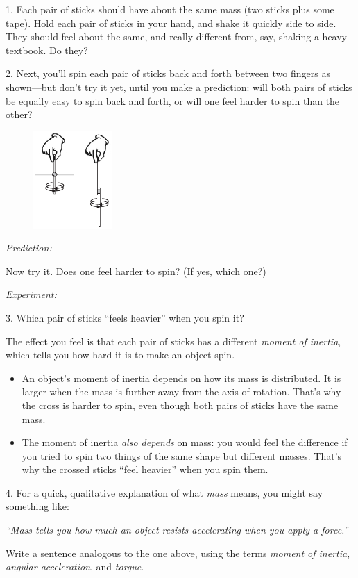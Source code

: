 1.  Each pair of sticks should have about the same mass (two sticks plus some tape).  Hold each pair of sticks in your hand, and shake it quickly side to side.  They should feel about the same, and really different from, say, shaking a heavy textbook.  Do they?
\answerspace{0.2in}


2.  Next, you'll spin each pair of sticks back and forth between two fingers as shown---but don't try it yet, until you make a prediction: will both pairs of sticks be equally easy to spin back and forth, or will one feel harder to spin than the other?

\begin{figure}
    \vspace{-0.45in}
    \includegraphics[width=0.27\textwidth]{moment_inertia_feel/stick_pics2.eps}
\end{figure}

\hspace{0.5in}\textit{Prediction:}
\answerspace{0.2in}

Now try it.  Does one feel harder to spin?  (If yes, which one?)

\hspace{0.5in}\textit{Experiment:}
\answerspace{0.2in}

3.  Which pair of sticks ``feels heavier'' when you spin it?
\answerspace{0.3in}

The effect you feel is that each pair of sticks has a different \textit{moment of inertia}, which tells you how hard it is to make an object spin.  
\begin{itemize}[nosep]
\item An object's moment of inertia depends on how its mass is distributed.  It is larger when the mass is further away from the axis of rotation.  That's why the cross is harder to spin, even though both pairs of sticks have the same mass.
\item The moment of inertia \textit{also depends} on mass: you would feel the difference if you tried to spin two things of the same shape but different masses.  That's why the crossed sticks ``feel heavier'' when you spin them.  
\end{itemize}
4. For a quick, qualitative explanation of what \textit{mass} means, you might say something like:

\hspace{0.5in}\textit{``Mass tells you how much an object resists accelerating when you apply a force.''}

Write a sentence analogous to the one above, using the terms \textit{moment of inertia}, \textit{angular acceleration}, and \textit{torque}.
\answerspace{0.3in}




